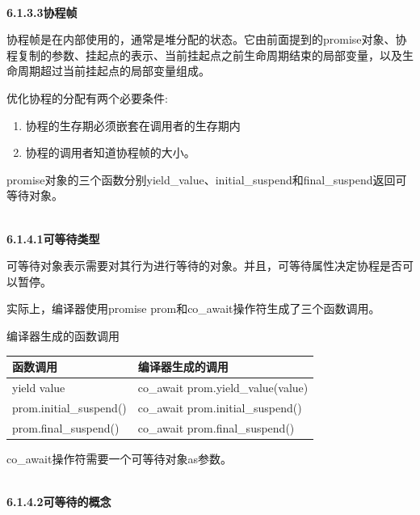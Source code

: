 \hspace*{\fill} \\ %
\noindent
\textbf{6.1.3.3\hspace{0.2cm}协程帧}

协程帧是在内部使用的，通常是堆分配的状态。它由前面提到的promise对象、协程复制的参数、挂起点的表示、当前挂起点之前生命周期结束的局部变量，以及生命周期超过当前挂起点的局部变量组成。

优化协程的分配有两个必要条件:

\begin{enumerate}
\item 
协程的生存期必须嵌套在调用者的生存期内

\item 
协程的调用者知道协程帧的大小。

\end{enumerate}


promise对象的三个函数分别yield\_value、initial\_suspend和final\_suspend返回可等待对象。

\hspace*{\fill} \\ %
\noindent
\textbf{6.1.4.1\hspace{0.2cm}可等待类型}

可等待对象表示需要对其行为进行等待的对象。并且，可等待属性决定协程是否可以暂停。

实际上，编译器使用promise prom和co\_await操作符生成了三个函数调用。

\begin{center}
编译器生成的函数调用
\end{center}

\begin{table}[H]
\centering
\begin{tabular}{ll}
\textbf{函数调用}           & \textbf{编译器生成的调用}   \\ \hline
yield value             & co\_await prom.yield\_value(value) \\
prom.initial\_suspend() & co\_await prom.initial\_suspend()  \\
prom.final\_suspend()   & co\_await prom.final\_suspend()   
\end{tabular}
\end{table}

co\_await操作符需要一个可等待对象as参数。

\hspace*{\fill} \\ %
\noindent
\textbf{6.1.4.2\hspace{0.2cm}可等待的概念}

